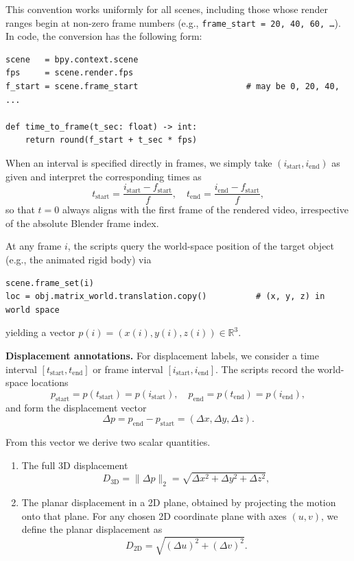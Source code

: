 This convention works uniformly for all scenes, including those whose render ranges begin at non-zero frame numbers (e.g., \texttt{frame\_start = 20, 40, 60, \dots}). In code, the conversion has the following form:

\begin{verbatim}
scene   = bpy.context.scene
fps     = scene.render.fps
f_start = scene.frame_start                      # may be 0, 20, 40, ...

def time_to_frame(t_sec: float) -> int:
    return round(f_start + t_sec * fps)
\end{verbatim}

When an interval is specified directly in frames, we simply take \((i_{\text{start}}, i_{\text{end}})\) as given and interpret the corresponding times as
\[
t_{\text{start}} = \frac{i_{\text{start}} - f_{\text{start}}}{f},\quad
t_{\text{end}}   = \frac{i_{\text{end}}   - f_{\text{start}}}{f},
\]
so that \(t = 0\) always aligns with the first frame of the rendered video, irrespective of the absolute Blender frame index.

At any frame \(i\), the scripts query the world-space position of the target object (e.g., the animated rigid body) via

\begin{verbatim}
scene.frame_set(i)
loc = obj.matrix_world.translation.copy()          # (x, y, z) in world space
\end{verbatim}

yielding a vector $p(i) = (x(i), y(i), z(i)) \in \mathbb{R}^3$.

\noindent\textbf{Displacement annotations.}
For displacement labels, we consider a time interval \([t_{\text{start}}, t_{\text{end}}]\)  or frame interval \([i_{\text{start}}, i_{\text{end}}]\). The scripts record the world-space locations
\[
p_{\text{start}} = p(t_{\text{start}}) = p(i_{\text{start}}),\quad
p_{\text{end}}   = p(t_{\text{end}})   = p(i_{\text{end}}),
\]
and form the displacement vector
\[
\Delta p = p_{\text{end}} - p_{\text{start}} = (\Delta x, \Delta y, \Delta z).
\]

From this vector we derive two scalar quantities.

\begin{enumerate}
    
\item The full 3D displacement
\[
D_{\text{3D}} = \lVert \Delta p \rVert_2 = \sqrt{\Delta x^2 + \Delta y^2 + \Delta z^2},
\]
\item The planar displacement in a 2D plane, obtained by projecting the motion onto that plane. 
For any chosen 2D coordinate plane with axes \((u, v)\), we define the planar displacement as
\[
D_{2\text{D}} = \sqrt{(\Delta u)^2 + (\Delta v)^2}.
\]
\end{enumerate}

